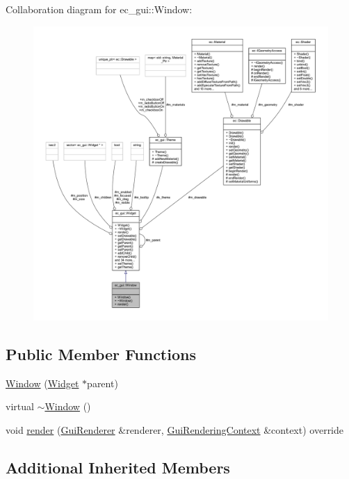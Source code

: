 Collaboration diagram for ec\+\_\+gui\+:\+:Window\+:\nopagebreak
\begin{figure}[H]
\begin{center}
\leavevmode
\includegraphics[width=350pt]{classec__gui_1_1_window__coll__graph}
\end{center}
\end{figure}
\subsection*{Public Member Functions}
\begin{DoxyCompactItemize}
\item 
\mbox{\hyperlink{classec__gui_1_1_window_a7841453949917ebed1df39cbd1f77532}{Window}} (\mbox{\hyperlink{classec__gui_1_1_widget}{Widget}} $\ast$parent)
\item 
virtual \mbox{\hyperlink{classec__gui_1_1_window_a9a8b81905961bb2a8761ed1770253b20}{$\sim$\+Window}} ()
\item 
void \mbox{\hyperlink{classec__gui_1_1_window_a8a18cca8b005dcb88365ede4b5095dc9}{render}} (\mbox{\hyperlink{classec__gui_1_1_gui_renderer}{Gui\+Renderer}} \&renderer, \mbox{\hyperlink{classec__gui_1_1_gui_rendering_context}{Gui\+Rendering\+Context}} \&context) override
\end{DoxyCompactItemize}
\subsection*{Additional Inherited Members}


